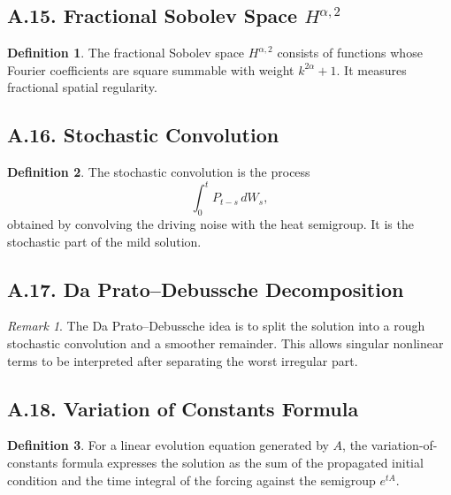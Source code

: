 \documentclass[11pt]{article}
\theoremstyle{definition}
\newtheorem{definition}{Definition}
\theoremstyle{remark}
\newtheorem{remark}{Remark}
\begin{document}
\subsection*{A.15. Fractional Sobolev Space \(H^{\alpha,2}\)}
\begin{definition}
The fractional Sobolev space \(H^{\alpha,2}\) consists of functions whose Fourier coefficients are square summable with weight \(k^{2\alpha}+1\). It measures fractional spatial regularity.
\end{definition}

\subsection*{A.16. Stochastic Convolution}
\begin{definition}
The stochastic convolution is the process
\[
\int_0^t P_{t-s}\,dW_s,
\]
obtained by convolving the driving noise with the heat semigroup. It is the stochastic part of the mild solution.
\end{definition}

\subsection*{A.17. Da Prato--Debussche Decomposition}
\begin{remark}
The Da Prato--Debussche idea is to split the solution into a rough stochastic convolution and a smoother remainder. This allows singular nonlinear terms to be interpreted after separating the worst irregular part.
\end{remark}

\subsection*{A.18. Variation of Constants Formula}
\begin{definition}
For a linear evolution equation generated by \(A\), the variation-of-constants formula expresses the solution as the sum of the propagated initial condition and the time integral of the forcing against the semigroup \(e^{tA}\).
\end{definition}
\end{document}

